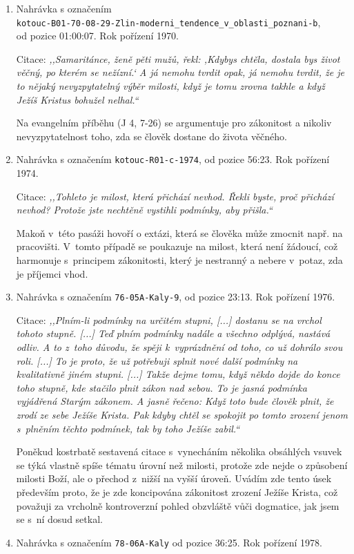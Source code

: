 \begin{enumerate}
  \item{
    Nahrávka s označením \\
    \texttt{kotouc-B01-70-08-29-Zlin-moderni\_tendence\_v\_oblasti\_poznani-b},\\
    od pozice 01:00:07.  Rok pořízení 1970.

    Citace: \textit{%
      ,,Samaritánce, ženě pěti mužů, řekl: ,Kdybys chtěla, dostala bys život
      věčný, po kterém se nežízní.` A já nemohu tvrdit opak, já nemohu tvrdit,
      že je to nějaký nevyzpytatelný výběr milosti, když je tomu zrovna takhle a
      když Ježíš Kristus bohužel nelhal.``
    }

    Na evangelním příběhu (J 4, 7-26) se argumentuje pro zákonitost a nikoliv
    nevyzpytatelnost toho, zda se člověk dostane do života věčného.
  }
  \item{
    Nahrávka s označením \texttt{kotouc-R01-c-1974}, od pozice 56:23.
    Rok pořízení 1974.

    Citace: \textit{%
      ,,Tohleto je milost, která přichází nevhod. Řekli byste, proč přichází
      nevhod? Protože jste nechtěně vystihli podmínky, aby přišla.``
    }

    Makoň v~této pasáži hovoří o extázi, která se člověka může zmocnit např. na
    pracovišti. V~tomto případě se poukazuje na milost, která není žádoucí, což
    harmonuje s~principem zákonitosti, který je nestranný a nebere v~potaz, zda
    je příjemci vhod.
  }
  \item{
    Nahrávka s označením \texttt{76-05A-Kaly-9}, od pozice 23:13.
    Rok pořízení 1976.

    Citace: \textit{%
      ,,Plním-li podmínky na určitém stupni, [...] dostanu se na vrchol tohoto
      stupně. [...] Teď plním podmínky nadále a všechno odplývá, nastává odliv.
      A to z~toho důvodu, že spěji k~vyprázdnění od toho, co už dohrálo svou
      roli. [...] To je proto, že už potřebuji splnit nové další podmínky na
      kvalitativně jiném stupni. [...] Takže dejme tomu, když někdo dojde do
      konce toho stupně, kde stačilo plnit zákon nad sebou. To je jasná podmínka
      vyjádřená Starým zákonem. A jasně řečeno: Když toto bude člověk plnit, že
      zrodí ze sebe Ježíše Krista. Pak kdyby chtěl se spokojit po tomto zrození
      jenom s~plněním těchto podmínek, tak by toho Ježíše zabil.``
    }

    Poněkud kostrbatě sestavená citace s~vynecháním několika obsáhlých vsuvek se
    týká vlastně spíše tématu úrovní než milosti, protože zde nejde o způsobení
    milosti Boží, ale o přechod z~nižší na vyšší úroveň. Uvádím zde tento úsek
    především proto, že je zde koncipována zákonitost zrození Ježíše Krista, což
    považuji za vrcholně kontroverzní pohled obzvláště vůči dogmatice, jak jsem
    se s~ní dosud setkal.%
  }
  \item{
    Nahrávka s označením \texttt{78-06A-Kaly} od pozice 36:25.
    Rok pořízení 1978.

}
\end{enumerate}
